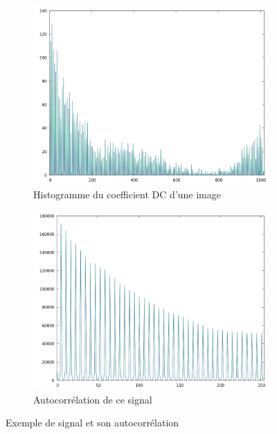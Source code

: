 \documentclass[utf8,final]{stageM2R} %
\begin{document}
\begin{figure}
  \begin{subfigure}{.5\textwidth}
    \centering
    \includegraphics[width=\linewidth]{images/signal}
    \caption{Histogramme du coefficient DC d'une image}
    \label{fig:signal}
  \end{subfigure}
  \begin{subfigure}{.5\textwidth}
    \centering
    \includegraphics[width=\linewidth]{images/autocorrelation}
    \caption{Autocorrélation de ce signal}
    \label{fig:autocorrel}
  \end{subfigure}
  \caption{Exemple de signal et son autocorrélation}
\end{figure}
\end{document}
